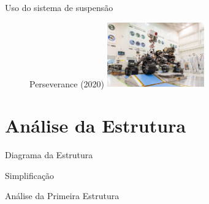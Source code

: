 \documentclass[11pt]{beamer}
\begin{document}
\begin{frame}{Uso do sistema de suspensão}
\begin{figure}[ht]
\begin{minipage}[b]{.32\textwidth}
    \end{minipage}%
    \hspace{5mm}
    \begin{minipage}[b]{.32\textwidth}
      \centering
      Perseverance (2020)
      \includegraphics[width=.9\textwidth,height=2.8cm]{fig/perseverance.jpg}
    \end{minipage}%
  \end{figure}
\end{frame}

\section{Análise da Estrutura}

\begin{frame}{Diagrama da Estrutura}
  \begin{figure}[ht]
    \centering
    \resizebox{.8\textwidth}{!}{}
  \end{figure}
\end{frame}

\begin{frame}{Simplificação}
  \begin{figure}[ht]
    \centering
    \resizebox{.8\textwidth}{!}{}
  \end{figure}
\end{frame}

\begin{frame}{Análise da Primeira Estrutura}
  \begin{figure}[ht]
    \centering
    \resizebox{.75\textwidth}{!}{}
  \end{figure}
\end{frame}
\end{document}
